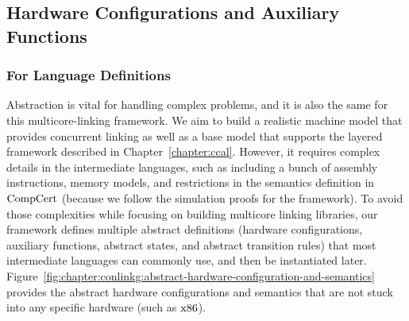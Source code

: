\subsection{Hardware Configurations and Auxiliary Functions}
\label{chapter:linking:subsec:hardware-configuration}

\subsubsection{For Language Definitions}

Abstraction is vital for handling complex problems, and it is also the same for this multicore-linking framework.
We aim to build a realistic machine model that provides 
concurrent linking as well as a base model that supports 
the layered framework described in Chapter~\ref{chapter:ccal}.
However, it requires complex details in the intermediate languages, 
such as including a bunch of assembly instructions, memory models, 
and restrictions in the semantics definition in $\mathrm{CompCert}$ (because we follow 
the simulation proofs for the framework).
To avoid those complexities while focusing on building multicore linking  libraries,
our framework defines multiple abstract definitions (hardware configurations, auxiliary functions, 
abstract states, and abstract transition rules)
that most intermediate languages can commonly use, 
and then be instantiated later. 
Figure~\ref{fig:chapter:conlinkg:abstract-hardware-configuration-and-semantics} provides the 
abstract hardware configurations and semantics that are
not stuck into any specific hardware (such as $\mathrm{x86}$).

